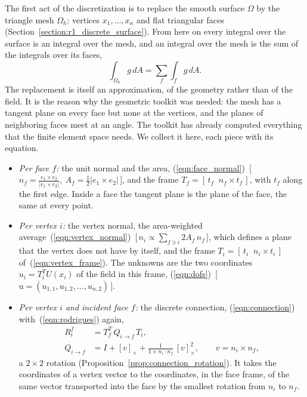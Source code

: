 The first act of the discretization is to replace the smooth surface $\Omega$ by the triangle mesh $\Omega_h$: vertices $x_1, \ldots, x_n$ and flat triangular faces (Section~\ref{section:r1_discrete_surface}). From here on every integral over the surface is an integral over the mesh, and an integral over the mesh is the sum of the integrals over its faces,
\begin{equation*}
\int_{\Omega_h} g\, dA = \sum_f \int_f g\, dA .
\end{equation*}
The replacement is itself an approximation, of the geometry rather than of the field. It is the reason why the geometric toolkit was needed: the mesh has a tangent plane on every face but none at the vertices, and the planes of neighboring faces meet at an angle. The toolkit has already computed everything that the finite element space needs. We collect it here, each piece with its equation.
\begin{itemize}
\item \emph{Per face $f$:} the unit normal and the area, (\ref{eqn:face_normal})~[\,$n_f = \frac{e_1\times e_2}{|e_1\times e_2|},\ A_f = \tfrac12|e_1\times e_2|$\,], and the frame $T_f = [\,t_f\;\;n_f\times t_f\,]$, with $t_f$ along the first edge. Inside a face the tangent plane is the plane of the face, the same at every point.
\item \emph{Per vertex $i$:} the vertex normal, the area-weighted average~(\ref{eqn:vertex_normal})~[\,$n_i \propto \sum_{f\ni i} 2A_f\, n_f$\,], which defines a plane that the vertex does not have by itself, and the frame $T_i = [\,t_i\;\;n_i\times t_i\,]$ of~(\ref{eqn:vertex_frame}). The unknowns are the two coordinates $u_i = T_i^T U(x_i)$ of the field in this frame, (\ref{eqn:dofs})~[\,$\mathrm u = (u_{1,1}, u_{1,2}, \ldots, u_{n,2})$\,].
\item \emph{Per vertex $i$ and incident face $f$:} the discrete connection, (\ref{eqn:connection}) with~(\ref{eqn:rodrigues}) again,
\begin{equation*}
\begin{aligned}
R_i^f &= T_f^T\, Q_{i \to f}\, T_i , \\
Q_{i\to f} &= I + [v]_\times + \frac{1}{1 + n_i \cdot n_f}\, [v]_\times^2 , \qquad v = n_i \times n_f ,
\end{aligned}
\end{equation*}
a $2\times 2$ rotation (Proposition~\ref{prop:connection_rotation}). It takes the coordinates of a vertex vector to the coordinates, in the face frame, of the same vector transported into the face by the smallest rotation from $n_i$ to $n_f$.
\end{itemize}

